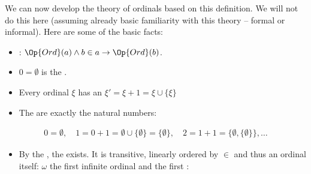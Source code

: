\documentclass[letterpaper,10pt,english]{jupyterBook}
\begin{document}
\sphinxAtStartPar
We can now develop the theory of ordinals based on this definition. We will not do this here (assuming already basic familiarity with this theory – formal or informal). Here are some of the basic facts:
\begin{itemize}
\item {} 
\sphinxAtStartPar
{}: \(\Op{Ord}(a) \wedge b \in a \to \Op{Ord}(b)\).

\item {} 
\sphinxAtStartPar
\(0 = \emptyset\) is the .

\item {} 
\sphinxAtStartPar
Every ordinal \(\xi\) has an  \(\xi' =  \xi+1 = \xi \cup \{\xi\}\)

\item {} 
\sphinxAtStartPar
The  are exactly the natural numbers:

\end{itemize}
\begin{equation*}
\begin{split}
0 = \emptyset, \quad 1 = 0 + 1 = \emptyset \cup \{\emptyset\} = \{\emptyset\}, \quad 2 = 1+1 = \{\emptyset, \{\emptyset\} \}, \dots
\end{split}
\end{equation*}\begin{itemize}
\item {} 
\sphinxAtStartPar
By the , the  exists. It is transitive, linearly ordered by \(\in\) and thus an ordinal itself: \(\omega\) the first infinite ordinal and the first :

\end{itemize}
\end{document}
